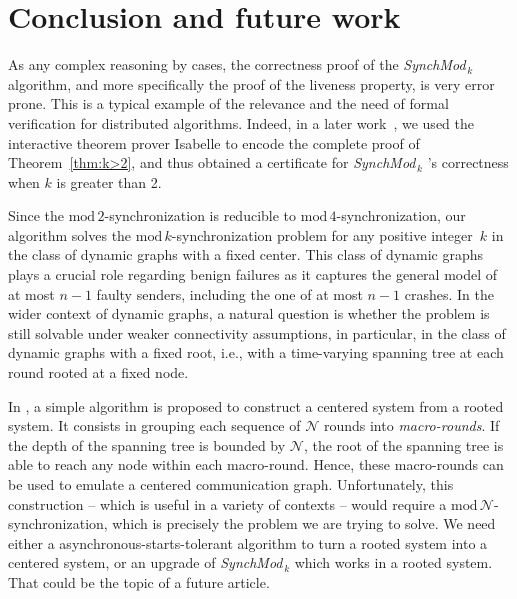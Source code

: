 \documentclass{article}
\newcommand{\SM}{{\em SynchMod}$_{\,k}$ }
\begin{document}
	



\section{Conclusion and future work}

As any complex reasoning by cases, the correctness proof  of the \SM  algorithm, 
	and more specifically the proof of the liveness property, is very error prone. 
This is a typical example of the relevance and the need of formal verification for distributed algorithms. 
Indeed, in a later work~\cite{}, we used the interactive theorem prover Isabelle to encode the complete proof 
	of Theorem~\ref{thm:k>2}, and thus obtained a certificate for  \SM\!\!'s correctness when $k$ is greater than 2.
	
Since the $\mathrm{mod}\,2$-synchronization is reducible to $\mathrm{mod}\,4$-synchronization,
	 our algorithm solves the $\mathrm{mod}\,k$-synchronization problem for any positive integer~$k$
	 in the class of  dynamic  graphs with a fixed center.
This class of dynamic graphs plays a crucial role regarding benign failures as it captures 
	the general model of at most $n-1$ faulty senders, including the one of at most $n-1$ crashes.
In the wider context of dynamic graphs, a natural question is whether the problem is still solvable 
	under weaker connectivity assumptions, in particular, in the class of dynamic graphs with a fixed root, 
	i.e., with a time-varying spanning tree at each round rooted at a fixed node.

In \cite{model_ho}, a simple algorithm is proposed to construct a centered system from a rooted system.
It consists in grouping each sequence of $\mathcal{N}$ rounds into \textit{macro-rounds}.
If the depth of the spanning tree is bounded by $\mathcal{N}$, the root of the spanning tree is able to reach any node within each macro-round.
Hence, these macro-rounds can be used to emulate a centered communication graph.
Unfortunately, this construction -- which is useful in a variety of contexts -- would require a $\mathrm{mod}\,\mathcal{N}$-synchronization,
which is precisely the problem we are trying to solve.
We need either a asynchronous-starts-tolerant algorithm to turn a rooted system into a centered system, or an upgrade of \SM which works in a rooted system.
That could be the topic of a future article.

\printbibliography
\end{document}
